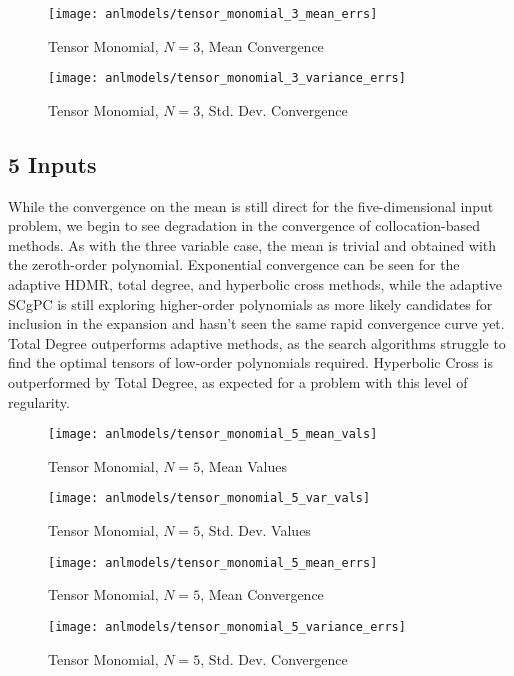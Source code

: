 \begin{figure}[H]
  \centering
  \texttt{[image: anlmodels/tensor\_monomial\_3\_mean\_errs]}
  \caption{Tensor Monomial, $N=3$, Mean Convergence}
  \label{fig:tensormono mean errors 3}
\end{figure}
\begin{figure}[H]
  \centering
  \texttt{[image: anlmodels/tensor\_monomial\_3\_variance\_errs]}
  \caption{Tensor Monomial, $N=3$, Std. Dev. Convergence}
  \label{fig:tensormono var errors 3}
\end{figure}




\subsection{5 Inputs}
While the convergence on the mean is still direct for the five-dimensional input problem, we begin to see
degradation in the convergence of collocation-based methods.  
As with the three variable case, the mean is trivial and obtained with the zeroth-order polynomial.  Exponential
convergence can be seen for the adaptive HDMR, total degree, and hyperbolic cross methods, while the adaptive SCgPC
is still exploring higher-order polynomials as more likely candidates for inclusion in the expansion and hasn't
seen the same rapid convergence curve yet.
Total Degree outperforms adaptive methods, as
the search algorithms struggle to find the optimal tensors of low-order polynomials required.  Hyperbolic
Cross is outperformed by Total Degree, as expected for a problem with this level of regularity.
\begin{figure}[H]
  \centering
  \texttt{[image: anlmodels/tensor\_monomial\_5\_mean\_vals]}
  \caption{Tensor Monomial, $N=5$, Mean Values}
  \label{fig:tensormono mean values 5}
\end{figure}
\begin{figure}[H]
  \centering
  \texttt{[image: anlmodels/tensor\_monomial\_5\_var\_vals]}
  \caption{Tensor Monomial, $N=5$, Std. Dev. Values}
  \label{fig:tensormono var values 5}
\end{figure}

\begin{figure}[H]
  \centering
  \texttt{[image: anlmodels/tensor\_monomial\_5\_mean\_errs]}
  \caption{Tensor Monomial, $N=5$, Mean Convergence}
  \label{fig:tensormono mean errors 5}
\end{figure}
\begin{figure}[H]
  \centering
  \texttt{[image: anlmodels/tensor\_monomial\_5\_variance\_errs]}
  \caption{Tensor Monomial, $N=5$, Std. Dev. Convergence}
  \label{fig:tensormono var errors 5}
\end{figure}

